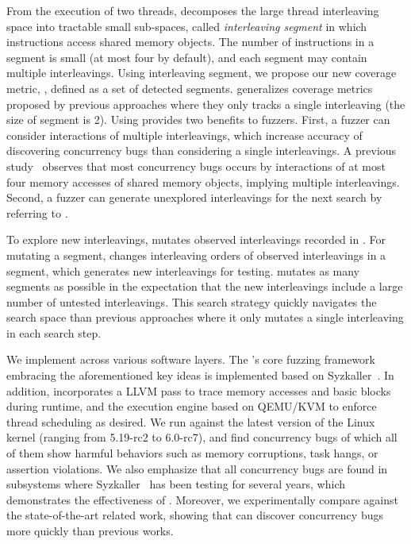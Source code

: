 From the execution of two threads,  
\sys decomposes the large thread interleaving space into tractable 
small sub-spaces, called \textit{interleaving segment} in which
instructions access shared memory objects. The number of instructions 
in a segment is small (at most four by default), and each segment may 
contain multiple interleavings. Using interleaving segment, we propose 
our new coverage metric, \textit{\intcov}, defined as a set of detected segments. \Intcov generalizes coverage 
metrics proposed by previous approaches where they only tracks 
a single interleaving (the size of segment is 2). 
Using \intcov provides two benefits to fuzzers. First, a fuzzer can 
consider interactions of multiple interleavings, which increase 
accuracy of discovering concurrency bugs than considering a single 
interleavings. A previous study~\cite{learningfrommistakes} observes that
most concurrency bugs occurs by interactions of at most four memory accesses of shared memory objects, implying multiple interleavings.
Second, a fuzzer can generate unexplored interleavings for the next 
search by referring to \intcov.

 To explore new interleavings,
\sys mutates observed interleavings recorded in \intcov. For mutating a segment, \sys changes interleaving orders of observed interleavings 
in a segment, which generates new interleavings for testing. \sys 
mutates as many segments as possible in the expectation that the 
new interleavings include a large number of untested interleavings. 
This search strategy quickly navigates the search space than previous 
approaches where it only mutates a single interleaving in each search step.



%
We implement \sys across various software layers.
The \sys's core fuzzing framework embracing the aforementioned key
ideas is implemented based on Syzkaller~\cite{syzkaller}.
%
In addition, \sys incorporates a LLVM pass to trace memory accesses
and basic blocks during runtime, and the execution engine based on
QEMU/KVM to enforce thread scheduling as desired.
%
We run \sys against the latest version of the Linux kernel (ranging
from 5.19-rc2 to 6.0-rc7), and find \totalbugs concurrency bugs of
which all of them show harmful behaviors such as memory corruptions,
task hangs, or assertion violations. We also emphasize that all
concurrency bugs are found in subsystems where
Syzkaller~\cite{syzkaller} has been testing for several years, which
demonstrates the effectiveness of \sys.
%
Moreover, we experimentally compare \sys against the state-of-the-art
related work, showing that \sys can discover concurrency bugs more
quickly than previous works.





